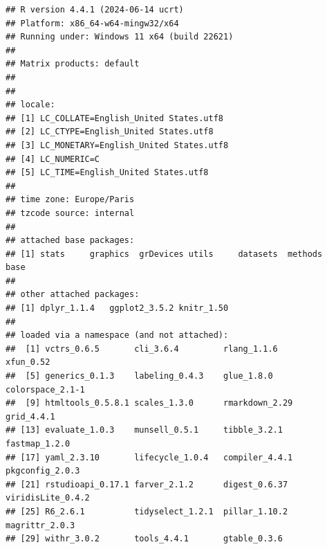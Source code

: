 \documentclass[
]{article}
\begin{document}
\begin{verbatim}
## R version 4.4.1 (2024-06-14 ucrt)
## Platform: x86_64-w64-mingw32/x64
## Running under: Windows 11 x64 (build 22621)
## 
## Matrix products: default
## 
## 
## locale:
## [1] LC_COLLATE=English_United States.utf8 
## [2] LC_CTYPE=English_United States.utf8   
## [3] LC_MONETARY=English_United States.utf8
## [4] LC_NUMERIC=C                          
## [5] LC_TIME=English_United States.utf8    
## 
## time zone: Europe/Paris
## tzcode source: internal
## 
## attached base packages:
## [1] stats     graphics  grDevices utils     datasets  methods   base     
## 
## other attached packages:
## [1] dplyr_1.1.4   ggplot2_3.5.2 knitr_1.50   
## 
## loaded via a namespace (and not attached):
##  [1] vctrs_0.6.5       cli_3.6.4         rlang_1.1.6       xfun_0.52        
##  [5] generics_0.1.3    labeling_0.4.3    glue_1.8.0        colorspace_2.1-1 
##  [9] htmltools_0.5.8.1 scales_1.3.0      rmarkdown_2.29    grid_4.4.1       
## [13] evaluate_1.0.3    munsell_0.5.1     tibble_3.2.1      fastmap_1.2.0    
## [17] yaml_2.3.10       lifecycle_1.0.4   compiler_4.4.1    pkgconfig_2.0.3  
## [21] rstudioapi_0.17.1 farver_2.1.2      digest_0.6.37     viridisLite_0.4.2
## [25] R6_2.6.1          tidyselect_1.2.1  pillar_1.10.2     magrittr_2.0.3   
## [29] withr_3.0.2       tools_4.4.1       gtable_0.3.6
\end{verbatim}
\end{document}
